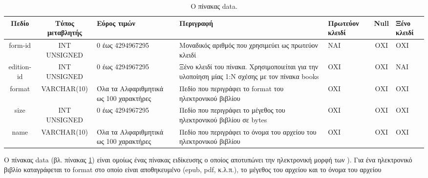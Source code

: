 \documentclass{assignment}
\begin{document}
\begin{landscape}
\begin{table}[htbp]
\begin{center}
  \begin{tabular}{|c|c|m{}|m{}|m{2.0cm}|c|m{1.5cm}|}
    \hline
    {\bf Πεδίο} & {\bf Τύπος μεταβλητής} & {\bf Εύρος τιμών} & {\bf Περιγραφή} & {\bf Πρωτεύον κλειδί} & {\bf Null} & {\bf Ξένο κλειδί} \\ \hline
    form-id & INT UNSIGNED & 0 έως 4294967295 & Μοναδικός αριθμός που χρησιμεύει ως πρωτεύον κλειδί & ΝΑΙ & ΟΧΙ & ΟΧΙ \\ \hline
    edition-id & INT UNSIGNED & 0 έως 4294967295 & Ξένο κλειδί του πίνακα. Χρησιμοποιείται για την υλοποίηση μίας 1:Ν σχέσης με τον πίνακα books & ΟΧΙ & ΟΧΙ & NAI \\ \hline
    format & VARCHAR(10) &  Όλα τα Αλφαριθμητικά ως 100 χαρακτήρες & Πεδίο που περιγράφει το format του ηλεκτρονικού βιβλίου & OXI & ΟΧΙ & ΟΧΙ \\ \hline
    size & INT UNSIGNED & 0 έως 4294967295 & Πεδίο που περιγράφει το μέγεθος του ηλεκτρονικού βιβλίου σε bytes & OXI & ΟΧΙ & ΟΧΙ \\ \hline
    name & VARCHAR(10) &  Όλα τα Αλφαριθμητικά ως 100 χαρακτήρες & Πεδίο που περιγράφει το όνομα του αρχείου του ηλεκτρονικού βιβλίου & OXI & ΟΧΙ & ΟΧΙ \\ \hline
  \end{tabular}
\caption{Ο πίνακας data.}
\label{table:db_table:data}
\end{center}
\end{table}

Ο πίνακας data (βλ. πίνακας \ref{table:db_table:data}) είναι ομοίως ένας πίνακας ειδίκευσης ο οποίος αποτυπώνει την ηλεκτρονική μορφή των ). Για ένα ηλεκτρονικό βιβλίο καταγράφεται το format στο οποίο είναι αποθηκευμένο (epub, pdf, κ.λ.π.), το μέγεθος του αρχείου και το όνομα του αρχείου
\end{landscape}
\end{document}
